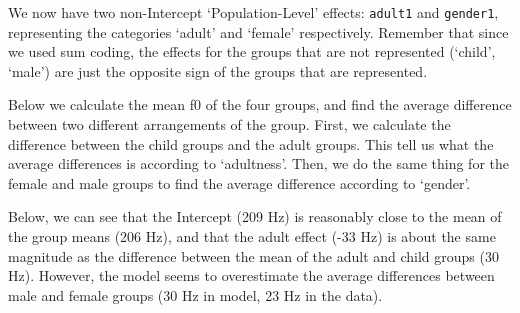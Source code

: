 \documentclass[
]{book}
\newenvironment{Shaded}{\begin{snugshade}}{\end{snugshade}}
\newcommand{\CommentTok}[1]{\textcolor[rgb]{0.56,0.35,0.01}{\textit{#1}}}
\newcommand{\DecValTok}[1]{\textcolor[rgb]{0.00,0.00,0.81}{#1}}
\newcommand{\DocumentationTok}[1]{\textcolor[rgb]{0.56,0.35,0.01}{\textbf{\textit{#1}}}}
\newcommand{\FunctionTok}[1]{\textcolor[rgb]{0.00,0.00,0.00}{#1}}
\newcommand{\NormalTok}[1]{#1}
\newcommand{\OtherTok}[1]{\textcolor[rgb]{0.56,0.35,0.01}{#1}}
\newcommand{\SpecialCharTok}[1]{\textcolor[rgb]{0.00,0.00,0.00}{#1}}
\newcommand{\StringTok}[1]{\textcolor[rgb]{0.31,0.60,0.02}{#1}}
\begin{document}
We now have two non-Intercept `Population-Level' effects: \texttt{adult1} and \texttt{gender1}, representing the categories `adult' and `female' respectively. Remember that since we used sum coding, the effects for the groups that are not represented (`child', `male') are just the opposite sign of the groups that are represented.

Below we calculate the mean f0 of the four groups, and find the average difference between two different arrangements of the group. First, we calculate the difference between the child groups and the adult groups. This tell us what the average differences is according to `adultness'. Then, we do the same thing for the female and male groups to find the average difference according to `gender'.

Below, we can see that the Intercept (209 Hz) is reasonably close to the mean of the group means (206 Hz), and that the adult effect (-33 Hz) is about the same magnitude as the difference between the mean of the adult and child groups (30 Hz). However, the model seems to overestimate the average differences between male and female groups (30 Hz in model, 23 Hz in the data).

\begin{Shaded}
\end{Shaded}
\end{document}
